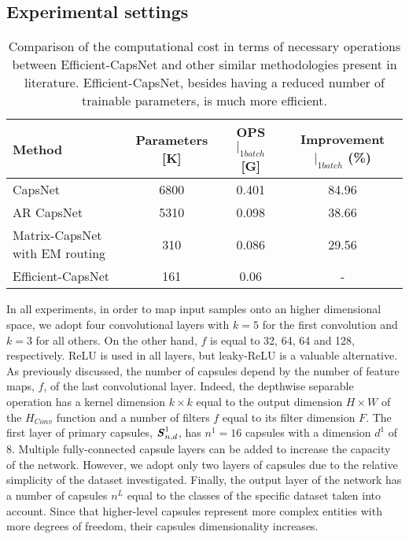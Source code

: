 \documentclass{article}
\begin{document}
\subsection{Experimental settings}
\begin{table}[b]
\centering
\begin{tabular}{lccc}
\toprule
Method                         & Parameters {[}K{]} & OPS$|_{1batch}$ {[}G{]} & Improvement$|_{1batch}$ (\%) \\ \hline
CapsNet \cite{sabour2017dynamic}        & 6800 &        0.401        & 84.96     \\
AR CapsNet \cite{choi2019attention}     & 5310 &        0.098        & 38.66   \\ 
Matrix-CapsNet with EM routing \cite{hinton2018matrix} & 310  & 0.086               & 29.56                   \\ 
Efficient-CapsNet      & 161 &         0.06                & -                       \\ \bottomrule
\end{tabular}
\caption{Comparison of the computational cost in terms of necessary operations between Efficient-CapsNet and other similar methodologies present in literature. Efficient-CapsNet, besides having a reduced number of trainable parameters, is much more efficient.}
\label{table:computation_cost}
\end{table}
In all experiments, in order to map input samples onto an higher dimensional space, we adopt four convolutional layers with $k=5$ for the first convolution and $k=3$ for all others. On the other hand, $f$ is equal to 32, 64, 64 and 128, respectively. ReLU is used in all layers, but leaky-ReLU is a valuable alternative. As previously discussed, the number of capsules depend by the number of feature maps, $f$, of the last convolutional layer. Indeed, the depthwise separable operation has a kernel dimension $k \times k$ equal to the output dimension $H \times W $ of the $H_{Conv}$ function and a number of filters $f$ equal to its filter dimension $F$. The first layer of primary capsules, $\textbf{\textit{S}}^1_{n,d}$, has $n^1=16$ capsules with a dimension $d^{1}$ of 8.
Multiple fully-connected capsule layers can be added to increase the capacity of the network. However, we adopt only two layers of capsules due to the relative simplicity of the dataset investigated. Finally, the output layer of the network has a number of capsules $n^L$ equal to the classes of the specific dataset taken into account. Since that higher-level capsules represent more complex entities with more degrees of freedom, their capsules dimensionality increases. 
\end{document}
